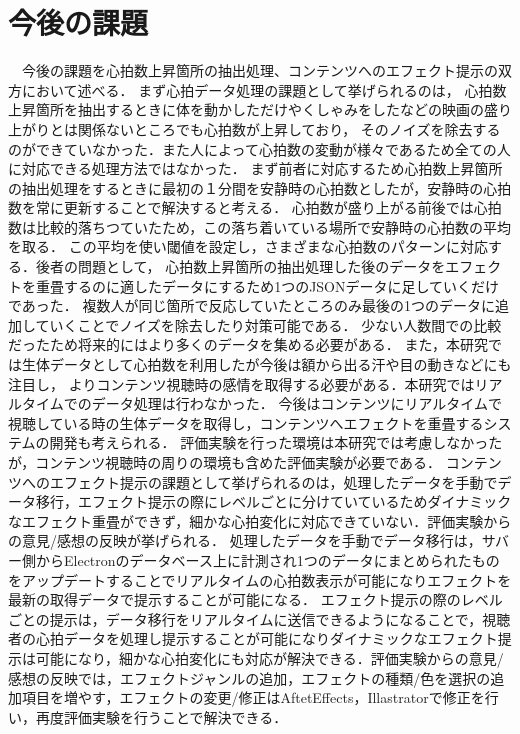 \section{今後の課題}
　今後の課題を心拍数上昇箇所の抽出処理、コンテンツへのエフェクト提示の双方において述べる．
まず心拍データ処理の課題として挙げられるのは，
心拍数上昇箇所を抽出するときに体を動かしただけやくしゃみをしたなどの映画の盛り上がりとは関係ないところでも心拍数が上昇しており，
そのノイズを除去するのができていなかった．また人によって心拍数の変動が様々であるため全ての人に対応できる処理方法ではなかった．
まず前者に対応するため心拍数上昇箇所の抽出処理をするときに最初の１分間を安静時の心拍数としたが，安静時の心拍数を常に更新することで解決すると考える．
心拍数が盛り上がる前後では心拍数は比較的落ちつていたため，この落ち着いている場所で安静時の心拍数の平均を取る．
この平均を使い閾値を設定し，さまざまな心拍数のパターンに対応する．後者の問題として，
心拍数上昇箇所の抽出処理した後のデータをエフェクトを重畳するのに適したデータにするため1つのJSONデータに足していくだけであった．
複数人が同じ箇所で反応していたところのみ最後の1つのデータに追加していくことでノイズを除去したり対策可能である．
少ない人数間での比較だったため将来的にはより多くのデータを集める必要がある．
また，本研究では生体データとして心拍数を利用したが今後は額から出る汗や目の動きなどにも注目し，
よりコンテンツ視聴時の感情を取得する必要がある．本研究ではリアルタイムでのデータ処理は行わなかった．
今後はコンテンツにリアルタイムで視聴している時の生体データを取得し，コンテンツへエフェクトを重畳するシステムの開発も考えられる．
評価実験を行った環境は本研究では考慮しなかったが，コンテンツ視聴時の周りの環境も含めた評価実験が必要である．
コンテンツへのエフェクト提示の課題として挙げられるのは，処理したデータを手動でデータ移行，エフェクト提示の際にレベルごとに分けていているためダイナミックなエフェクト重畳ができず，細かな心拍変化に対応できていない．評価実験からの意見/感想の反映が挙げられる．
処理したデータを手動でデータ移行は，サバー側からElectronのデータベース上に計測され1つのデータにまとめられたものをアップデートすることでリアルタイムの心拍数表示が可能になりエフェクトを最新の取得データで提示することが可能になる．
エフェクト提示の際のレベルごとの提示は，データ移行をリアルタイムに送信できるようになることで，視聴者の心拍データを処理し提示することが可能になりダイナミックなエフェクト提示は可能になり，細かな心拍変化にも対応が解決できる．評価実験からの意見/感想の反映では，エフェクトジャンルの追加，エフェクトの種類/色を選択の追加項目を増やす，エフェクトの変更/修正はAftetEffects，Illastratorで修正を行い，再度評価実験を行うことで解決できる．


